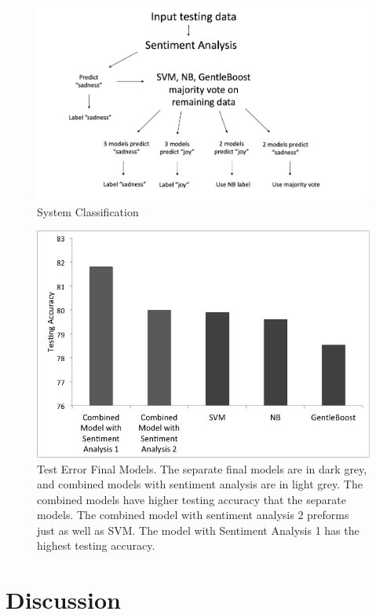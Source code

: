\documentclass[]{article}
\begin{document}
\begin{figure}
	\centering
  \includegraphics[scale=0.4]{Method.jpg}
  \caption{System Classification}
  \label{fig:System Classification}
\end{figure}

\begin{figure}
	\centering
  \includegraphics[scale=0.4]{FinalGraph.jpg}
  \caption{Test Error Final Models. The separate final models are in dark grey, and combined models with sentiment analysis are in light grey. The combined models have higher testing accuracy that the separate models. The combined model with sentiment analysis 2 preforms just as well as SVM. The model with Sentiment Analysis 1 has the highest testing accuracy.}
  \label{fig:Test Error}
\end{figure}

\section{Discussion}
\end{document}
